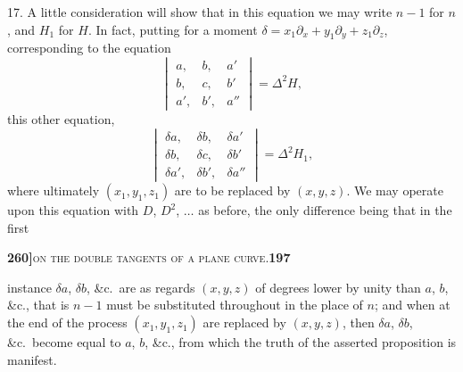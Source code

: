 \documentclass[11pt]{article}
\begin{document}
\medskip

17. A little consideration will show that in this equation we may write $n - 1$ for $n$, and $H_1$ for $H$. In fact, putting for a moment $\delta = x_1\partial_x + y_1\partial_y + z_1\partial_z$, corresponding to the equation
\[
\begin{vmatrix} a, & b, & a'\\ b, & c, & b'\\ a', & b', & a'' \end{vmatrix} = \Delta^2 H,
\]
this other equation,
\[
\begin{vmatrix} \delta a, & \delta b, & \delta a'\\ \delta b, & \delta c, & \delta b'\\ \delta a', & \delta b', & \delta a'' \end{vmatrix} = \Delta^2 H_1,
\]
where ultimately $(x_1, y_1, z_1)$ are to be replaced by $(x, y, z)$. We may operate upon this equation with $D$, $D^2$, $\ldots$ as before, the only difference being that in the first

\newpage

\noindent\textbf{260]}\hfill\textsc{on the double tangents of a plane curve.}\hfill\textbf{197}

\medskip

\noindent instance $\delta a$, $\delta b$, \&c.\ are as regards $(x, y, z)$ of degrees lower by unity than $a$, $b$, \&c., that is $n - 1$ must be substituted throughout in the place of $n$; and when at the end of the process $(x_1, y_1, z_1)$ are replaced by $(x, y, z)$, then $\delta a$, $\delta b$, \&c.\ become equal to $a$, $b$, \&c., from which the truth of the asserted proposition is manifest.

\medskip
\end{document}
